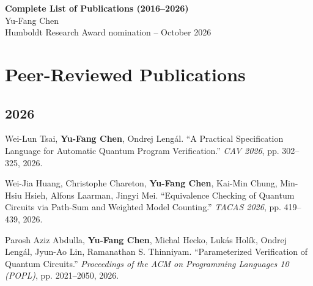 \documentclass[10.5pt,a4paper]{article}
\begin{document}
\begin{center}
{\Large\bfseries Complete List of Publications (2016--2026)}\\[3pt]
{\large Yu-Fang Chen}\\[2pt]
{\small Humboldt Research Award nomination -- October 2026}
\end{center}
\vspace{0.4em}
\section*{Peer-Reviewed Publications}
\subsection*{2026}
\begin{enumerate}[leftmargin=*,label={[\arabic*]},resume]
\item Wei-Lun Tsai, \textbf{Yu-Fang Chen}, Ondrej Lengál. ``A Practical Specification Language for Automatic Quantum Program Verification.'' \emph{CAV 2026}, pp. 302--325, 2026.
\item Wei-Jia Huang, Christophe Chareton, \textbf{Yu-Fang Chen}, Kai-Min Chung, Min-Hsiu Hsieh, Alfons Laarman, Jingyi Mei. ``Equivalence Checking of Quantum Circuits via Path-Sum and Weighted Model Counting.'' \emph{TACAS 2026}, pp. 419--439, 2026.
\item Parosh Aziz Abdulla, \textbf{Yu-Fang Chen}, Michal Hecko, Lukás Holík, Ondrej Lengál, Jyun-Ao Lin, Ramanathan S. Thinniyam. ``Parameterized Verification of Quantum Circuits.'' \emph{Proceedings of the ACM on Programming Languages 10 (POPL)}, pp. 2021--2050, 2026.
\end{enumerate}
\end{document}

